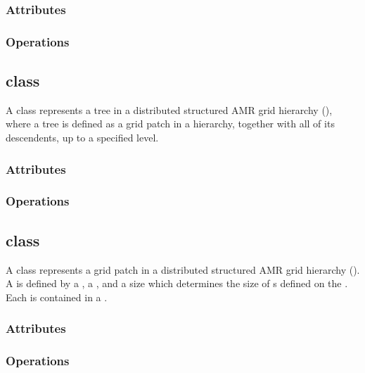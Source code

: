 \documentclass{article}
\begin{document}
\subsubsection{Attributes}

\subsubsection{Operations}

\subsection{ class}

A  class represents a tree in a distributed structured AMR
grid hierarchy (), where a tree is defined as a grid patch
in a hierarchy, together with all of its descendents, up to a specified
level.


\subsubsection{Attributes}

\subsubsection{Operations}

\subsection{ class}

A  class represents a grid patch in a distributed structured
AMR grid hierarchy ().  A  is defined by a
, a , and a size which determines
the size of s defined on the .  Each
 is contained in a .

\subsubsection{Attributes}

\subsubsection{Operations}
\end{document}
